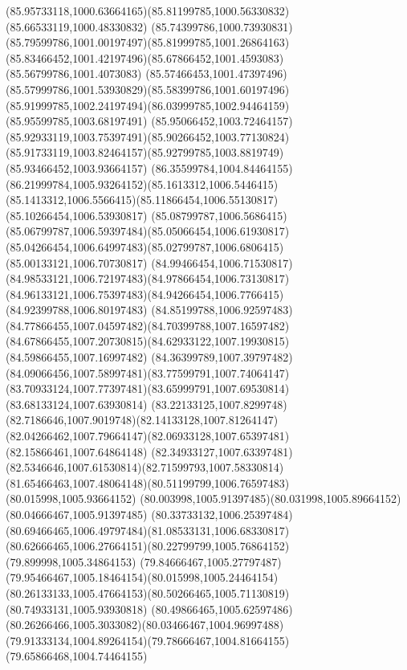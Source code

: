 {    \curveto(85.95733118,1000.63664165)(85.81199785,1000.56330832)(85.66533119,1000.48330832)
    \curveto(85.74399786,1000.73930831)(85.79599786,1001.00197497)(85.81999785,1001.26864163)
    \curveto(85.83466452,1001.42197496)(85.67866452,1001.4593083)(85.56799786,1001.4073083)
    \curveto(85.57466453,1001.47397496)(85.57999786,1001.53930829)(85.58399786,1001.60197496)
    \curveto(85.91999785,1002.24197494)(86.03999785,1002.94464159)(85.95599785,1003.68197491)
    \curveto(85.95066452,1003.72464157)(85.92933119,1003.75397491)(85.90266452,1003.77130824)
    \curveto(85.91733119,1003.82464157)(85.92799785,1003.8819749)(85.93466452,1003.93664157)
    \curveto(86.35599784,1004.84464155)(86.21999784,1005.93264152)(85.1613312,1006.5446415)
    \curveto(85.1413312,1006.5566415)(85.11866454,1006.55130817)(85.10266454,1006.53930817)
    \curveto(85.08799787,1006.5686415)(85.06799787,1006.59397484)(85.05066454,1006.61930817)
    \curveto(85.04266454,1006.64997483)(85.02799787,1006.6806415)(85.00133121,1006.70730817)
    \curveto(84.99466454,1006.71530817)(84.98533121,1006.72197483)(84.97866454,1006.73130817)
    \curveto(84.96133121,1006.75397483)(84.94266454,1006.7766415)(84.92399788,1006.80197483)
    \curveto(84.85199788,1006.92597483)(84.77866455,1007.04597482)(84.70399788,1007.16597482)
    \curveto(84.67866455,1007.20730815)(84.62933122,1007.19930815)(84.59866455,1007.16997482)
    \curveto(84.36399789,1007.39797482)(84.09066456,1007.58997481)(83.77599791,1007.74064147)
    \curveto(83.70933124,1007.77397481)(83.65999791,1007.69530814)(83.68133124,1007.63930814)
    \curveto(83.22133125,1007.8299748)(82.7186646,1007.9019748)(82.14133128,1007.81264147)
    \curveto(82.04266462,1007.79664147)(82.06933128,1007.65397481)(82.15866461,1007.64864148)
    \curveto(82.34933127,1007.63397481)(82.5346646,1007.61530814)(82.71599793,1007.58330814)
    \curveto(81.65466463,1007.48064148)(80.51199799,1006.76597483)(80.015998,1005.93664152)
    \curveto(80.003998,1005.91397485)(80.031998,1005.89664152)(80.04666467,1005.91397485)
    \curveto(80.33733132,1006.25397484)(80.69466465,1006.49797484)(81.08533131,1006.68330817)
    \curveto(80.62666465,1006.27664151)(80.22799799,1005.76864152)(79.899998,1005.34864153)
    \curveto(79.84666467,1005.27797487)(79.95466467,1005.18464154)(80.015998,1005.24464154)
    \curveto(80.26133133,1005.47664153)(80.50266465,1005.71130819)(80.74933131,1005.93930818)
    \curveto(80.49866465,1005.62597486)(80.26266466,1005.3033082)(80.03466467,1004.96997488)
    \curveto(79.91333134,1004.89264154)(79.78666467,1004.81664155)(79.65866468,1004.74464155)
}
